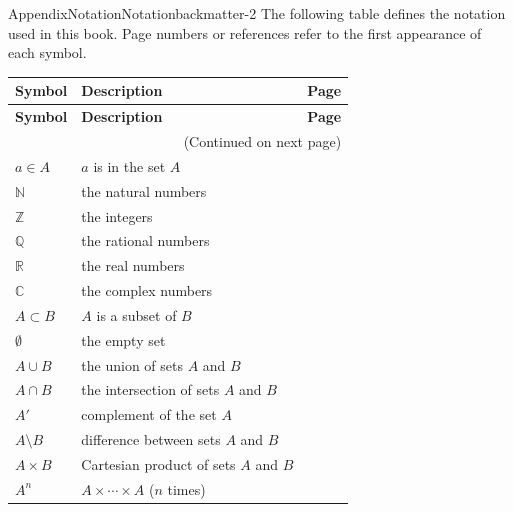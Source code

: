 \documentclass[oneside,10pt,]{book}
\numberwithin{equation}{section}
\begin{document}
\begin{appendixptx}{Appendix}{Notation}{}{Notation}{}{}{backmatter-2}
\renewcommand*{\appendixname}{Appendix}
The following table defines the notation used in this book. Page numbers or references refer to the first appearance of each symbol.%
\begin{longtable}[l]{lp{}r}
\addtocounter{table}{-1}
\textbf{Symbol}&\textbf{Description}&\textbf{Page}\\[1em]
\endfirsthead
\textbf{Symbol}&\textbf{Description}&\textbf{Page}\\[1em]
\endhead
\multicolumn{3}{r}{(Continued on next page)}\\
\endfoot
\endlastfoot
\(a \in A\)&\(a\) is in the set \(A\)&\pageref{section-sets-and-equivalence-relations-2-2-11}\\
\({\mathbb N}\)&the natural numbers&\pageref{section-sets-and-equivalence-relations-2-4-2}\\
\({\mathbb Z}\)&the integers&\pageref{section-sets-and-equivalence-relations-2-4-3}\\
\({\mathbb Q}\)&the rational numbers&\pageref{section-sets-and-equivalence-relations-2-4-4}\\
\({\mathbb R}\)&the real numbers&\pageref{section-sets-and-equivalence-relations-2-4-5}\\
\({\mathbb C}\)&the complex numbers&\pageref{section-sets-and-equivalence-relations-2-4-6}\\
\(A \subset B\)&\(A\) is a subset of \(B\)&\pageref{section-sets-and-equivalence-relations-2-5-8}\\
\(\emptyset\)&the empty set&\pageref{section-sets-and-equivalence-relations-2-6-3}\\
\(A \cup B\)&the union of sets \(A\) and \(B\)&\pageref{section-sets-and-equivalence-relations-2-7-10}\\
\(A \cap B\)&the intersection of sets \(A\) and \(B\)&\pageref{section-sets-and-equivalence-relations-2-7-11}\\
\(A'\)&complement of the set \(A\)&\pageref{section-sets-and-equivalence-relations-2-9-7}\\
\(A \setminus B\)&difference between sets \(A\) and \(B\)&\pageref{section-sets-and-equivalence-relations-2-10-4}\\
\(A \times B\)&Cartesian product of sets \(A\) and \(B\)&\pageref{section-sets-and-equivalence-relations-3-2-7}\\
\(A^n\)&\(A \times \cdots \times A\) (\(n\) times)&\pageref{section-sets-and-equivalence-relations-3-4-8}\\

\end{longtable}
\end{appendixptx}
\end{document}
